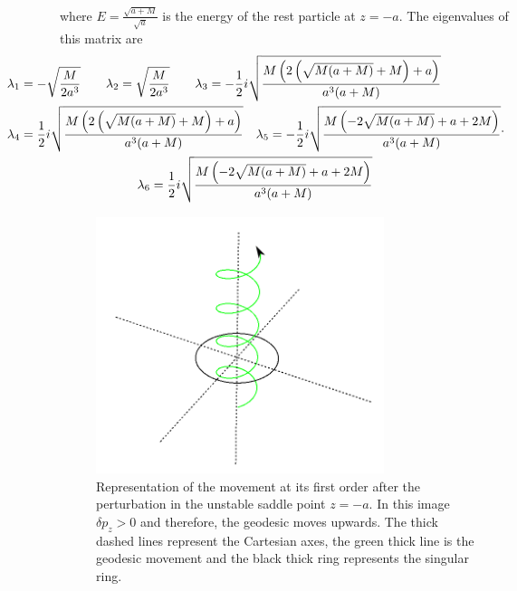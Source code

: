 where $E=\frac{\sqrt{a+M}}{\sqrt{a}}$ is the energy of the rest particle at $z=-a$. The eigenvalues of this matrix are
\begin{equation}
\hspace{-0.15\textwidth}
\begin{aligned}
&\lambda_1=-\sqrt{\frac{M}{2 a^3}} \quad \quad \lambda_2=\sqrt{\frac{M}{2 a^3}} \quad \quad \lambda_3=-\frac{1}{2} i \sqrt{\frac{M \left(2 \left(\sqrt{M (a+M)}+M\right)+a\right)}{a^3 (a+M)}}\\
&\lambda_4=\frac{1}{2} i \sqrt{\frac{M \left(2 \left(\sqrt{M (a+M)}+M\right)+a\right)}{a^3 (a+M)}} \quad \lambda_5=-\frac{1}{2} i \sqrt{\frac{M \left(-2 \sqrt{M (a+M)}+a+2 M\right)}{a^3 (a+M)}}\\
&\hspace{0.3\textwidth} \lambda_6=\frac{1}{2} i \sqrt{\frac{M \left(-2 \sqrt{M (a+M)}+a+2 M\right)}{a^3 (a+M)}}
\end{aligned}.
\end{equation}


 \begin{figure}[ht!]
\begin{center}
 \centerline{\includegraphics[width=0.75\textwidth]{img/Chapter3/lineje1.png}}
 \end{center}
 \caption{Representation of the movement at its first order after the perturbation in the unstable saddle point $z=-a$. In this image $\delta p_z>0$ and therefore, the geodesic moves upwards. The thick dashed lines represent the Cartesian axes, the green thick line is the geodesic movement and the black thick ring represents the singular ring.}
 \label{fig:spiral1}
\end{figure} 


